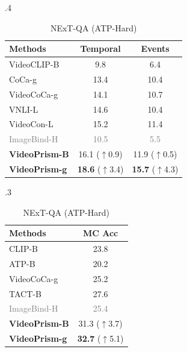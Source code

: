 \documentclass{article}
\theoremstyle{plain}
\theoremstyle{definition}
\theoremstyle{remark}
\newcommand{\OURS}{VideoPrism\xspace}
\newcommand{\upcolor}[1]{\textcolor{vpblue}{($\uparrow$#1)}}
\newcommand{\fadecell}[1]{\textcolor{gray}{#1}}
\begin{document}
\begin{table}[t]
\begin{subtable}[t]{.4\linewidth}
\begin{center}
\begin{scriptsize}
\begin{tabular}{@{}lcc@{}}
    	\toprule
    	Methods & Temporal & Events \\
    	\midrule
    	VideoCLIP-B~\cite{xu2021videoclip} & 9.8 & 6.4 \\
    	CoCa-g~\cite{yu2022coca} & 13.4 & 10.4 \\
    	VideoCoCa-g~\cite{yan2022videococa} & 14.1 & 10.7 \\
VNLI-L~\cite{yarom2023you} & 14.6 & 10.4 \\
    	VideoCon-L~\cite{bansal2023videocon} & 15.2 & 11.4 \\
    	\fadecell{ImageBind-H~\cite{girdhar2023imagebind}} & \fadecell{10.5} & \fadecell{5.5} \\
    	\textbf{\OURS-B} & 16.1 \upcolor{0.9} & 11.9 \upcolor{0.5} \\
        \textbf{\OURS-g} & \textbf{18.6} \upcolor{3.4} & \textbf{15.7} \upcolor{4.3} \\
    	\bottomrule
    \end{tabular}
    \end{scriptsize}
    \label{tbl:zs_cls:ssv2}
    \end{center}
\end{subtable}
\vskip 0.1in
\begin{subtable}[t]{.3\linewidth}
    \begin{center}
    \caption{NExT-QA (ATP-Hard)}
    \vspace{-0.3\baselineskip}
    \setlength{\tabcolsep}{4pt}
    \begin{scriptsize}
    \begin{tabular}{@{}lc@{}}
        \toprule Methods & MC Acc \\ 
      	\midrule
      	CLIP-B~\cite{radford2021learning} & 23.8 \\
ATP-B~\cite{buch2022revisiting} & 20.2 \\
    	VideoCoCa-g~\cite{yan2022videococa} & 25.2 \\
    	TACT-B~\cite{bagad2023test} & 27.6 \\
    	\fadecell{ImageBind-H~\cite{girdhar2023imagebind}} & \fadecell{25.4} \\
      	\textbf{\OURS-B} & 31.3 \upcolor{3.7} \\
    	\textbf{\OURS-g} & \textbf{32.7} \upcolor{5.1} \\
      	\bottomrule
    \end{tabular}
    \end{scriptsize}
    \label{tbl:zs_cls:nextqa}
    \end{center}
\end{subtable}

\end{table}
\end{document}
